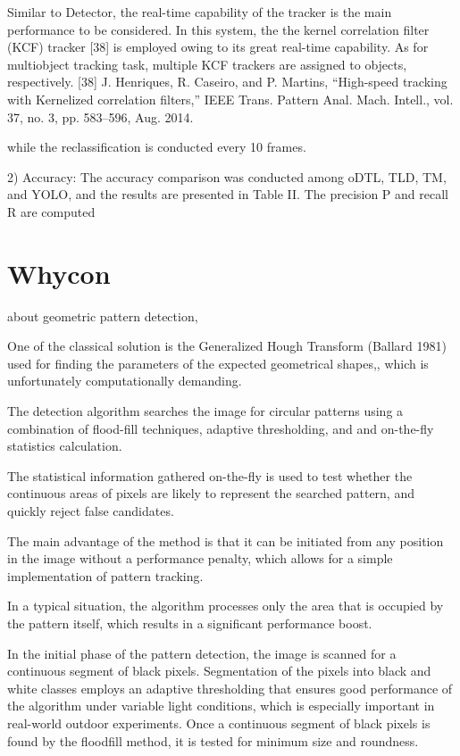 \documentclass[a4paper]{report}
\begin{document}
Similar to Detector, the real-time capability of the tracker is
the main performance to be considered. In this system, the the
kernel correlation filter (KCF) tracker [38] is employed owing
to its great real-time capability. As for multiobject tracking task,
multiple KCF trackers are assigned to objects, respectively.
[38] J. Henriques, R. Caseiro, and P. Martins, “High-speed tracking with
Kernelized correlation filters,” IEEE Trans. Pattern Anal. Mach. Intell.,
vol. 37, no. 3, pp. 583–596, Aug. 2014.

while the reclassification is conducted every 10 frames.

2) Accuracy: The accuracy comparison was conducted
among oDTL, TLD, TM, and YOLO, and the results are presented
in Table II. The precision P and recall R are computed

\section{Whycon}
about geometric pattern detection,

One of the classical solution is the Generalized Hough Transform (Ballard 1981) used for finding the parameters of the expected geometrical shapes,, which is
unfortunately computationally demanding.


The detection algorithm searches the image for circular patterns using a combination of flood-fill techniques, adaptive thresholding, and and on-the-fly statistics calculation.

The statistical information gathered on-the-fly is used to test
whether the continuous areas of pixels are likely to represent
the searched pattern, and quickly reject false candidates. 


The main advantage of the method is that it can be initiated from
any position in the image without a performance penalty,
which allows for a simple implementation of pattern tracking.


In a typical situation, the algorithm processes only the area that is occupied by the pattern itself, which results in a significant performance boost.

In the initial phase of the pattern detection, the image is scanned for a continuous segment of black pixels. Segmentation of the pixels into black and white classes employs an adaptive thresholding that ensures good performance of the algorithm under variable light conditions, which is especially important in real-world outdoor experiments. Once a continuous segment of black pixels is found by the floodfill
method, it is tested for minimum size and roundness.
\end{document}

